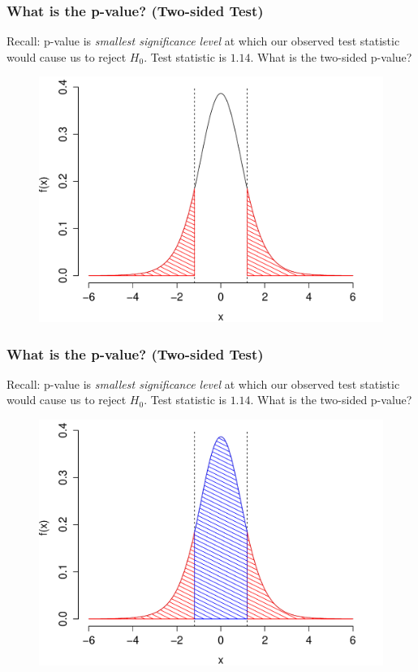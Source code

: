 \begin{frame}
\frametitle{What is the p-value? (Two-sided Test)}
\footnotesize
Recall: p-value is \emph{smallest significance level} at which our observed test statistic would cause us to reject $H_0$. \alert{Test statistic is $1.14$. What is the two-sided p-value? }
\begin{figure}
\includegraphics[scale= 0.4]{./images/p_both4}

\end{figure}

\end{frame}

\begin{frame}
\frametitle{What is the p-value? (Two-sided Test)}
\footnotesize
Recall: p-value is \emph{smallest significance level} at which our observed test statistic would cause us to reject $H_0$. \alert{Test statistic is $1.14$. What is the two-sided p-value? }
\begin{figure}
\includegraphics[scale= 0.4]{./images/p_both5}

\end{figure}

\end{frame}

